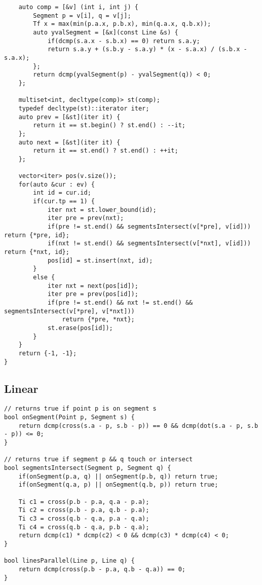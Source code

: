 \documentclass[FSZ,a4paper,onesided]{article}
\begin{document}
\begin{multicols*}{\COLS}
\begin{lstlisting}
    auto comp = [&v] (int i, int j) {
        Segment p = v[i], q = v[j];
        Tf x = max(min(p.a.x, p.b.x), min(q.a.x, q.b.x));
        auto yvalSegment = [&x](const Line &s) {
            if(dcmp(s.a.x - s.b.x) == 0) return s.a.y;
            return s.a.y + (s.b.y - s.a.y) * (x - s.a.x) / (s.b.x - s.a.x);
        };
        return dcmp(yvalSegment(p) - yvalSegment(q)) < 0;
    };

    multiset<int, decltype(comp)> st(comp);
    typedef decltype(st)::iterator iter;
    auto prev = [&st](iter it) {
        return it == st.begin() ? st.end() : --it;
    };
    auto next = [&st](iter it) {
        return it == st.end() ? st.end() : ++it;
    };

    vector<iter> pos(v.size());
    for(auto &cur : ev) {
        int id = cur.id;
        if(cur.tp == 1) {
            iter nxt = st.lower_bound(id);
            iter pre = prev(nxt);
            if(pre != st.end() && segmentsIntersect(v[*pre], v[id]))   return {*pre, id};
            if(nxt != st.end() && segmentsIntersect(v[*nxt], v[id]))   return {*nxt, id};
            pos[id] = st.insert(nxt, id);
        }
        else {
            iter nxt = next(pos[id]);
            iter pre = prev(pos[id]);
            if(pre != st.end() && nxt != st.end() && segmentsIntersect(v[*pre], v[*nxt]))
                return {*pre, *nxt};
            st.erase(pos[id]);
        }
    }
    return {-1, -1};
}\end{lstlisting}
\subsection{Linear}
\begin{lstlisting}
// returns true if point p is on segment s
bool onSegment(Point p, Segment s) {
    return dcmp(cross(s.a - p, s.b - p)) == 0 && dcmp(dot(s.a - p, s.b - p)) <= 0;
}

// returns true if segment p && q touch or intersect
bool segmentsIntersect(Segment p, Segment q) {
    if(onSegment(p.a, q) || onSegment(p.b, q)) return true;
    if(onSegment(q.a, p) || onSegment(q.b, p)) return true;

    Ti c1 = cross(p.b - p.a, q.a - p.a);
    Ti c2 = cross(p.b - p.a, q.b - p.a);
    Ti c3 = cross(q.b - q.a, p.a - q.a);
    Ti c4 = cross(q.b - q.a, p.b - q.a);
    return dcmp(c1) * dcmp(c2) < 0 && dcmp(c3) * dcmp(c4) < 0;
}

bool linesParallel(Line p, Line q) {
    return dcmp(cross(p.b - p.a, q.b - q.a)) == 0;
}


\end{lstlisting}
\end{multicols*}
\end{document}
